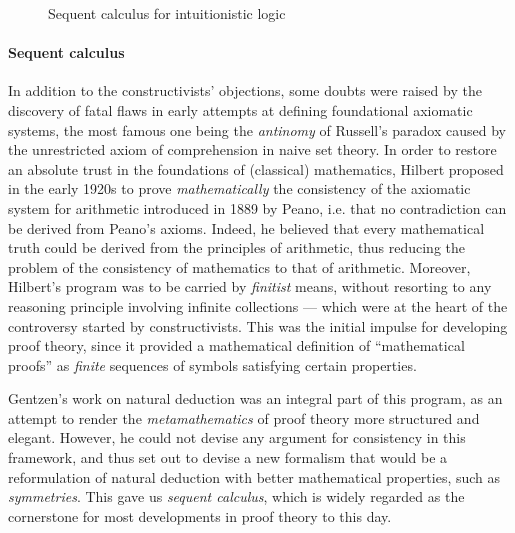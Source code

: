 \begin{figure*}
  
  \caption{Sequent calculus  for intuitionistic logic}
\end{figure*}

\paragraph{Sequent calculus}

In addition to the constructivists' objections, some doubts were raised by the
discovery of fatal flaws in early attempts at defining foundational axiomatic
systems, the most famous one being the \emph{antinomy} of Russell's paradox
caused by the unrestricted axiom of comprehension in naive set theory. In order
to restore an absolute trust in the foundations of (classical) mathematics,
Hilbert proposed in the early 1920s to prove \emph{mathematically} the
consistency of the axiomatic system for arithmetic introduced in 1889 by
Peano,
i.e. that no contradiction can be derived from Peano's axioms. Indeed, he
believed that every mathematical truth could be derived from the principles of
arithmetic, thus reducing the problem of the consistency of mathematics to that
of arithmetic. Moreover, Hilbert's program was to be carried by \emph{finitist}
means, without resorting to any reasoning principle involving infinite
collections --- which were at the heart of the controversy started by
constructivists. This was the initial impulse for developing proof theory, since
it provided a mathematical definition of ``mathematical proofs'' as
\emph{finite} sequences of symbols satisfying certain properties.

Gentzen's work on natural deduction was an integral part of this program, as an
attempt to render the \emph{metamathematics} of proof theory more structured and
elegant. However, he could not devise any argument for consistency in this
framework, and thus set out to devise a new formalism that would be a
reformulation of natural deduction with better mathematical properties, such as
\emph{symmetries}. This gave us \emph{sequent calculus}, which is widely
regarded as the cornerstone for most developments in proof theory to this day.

